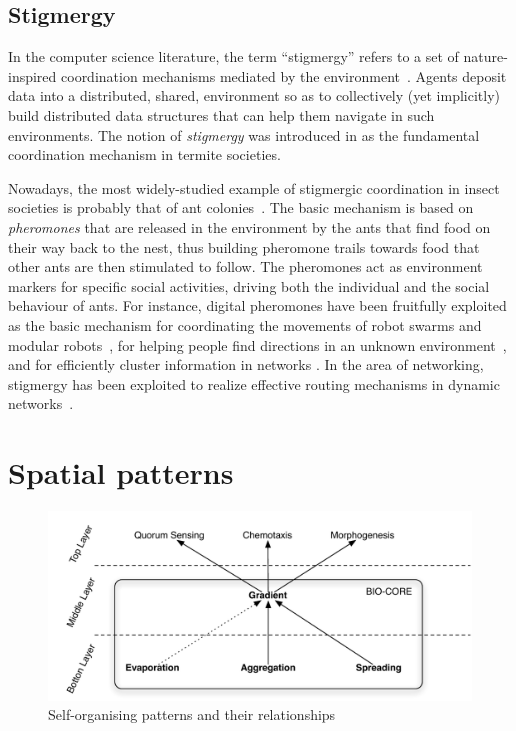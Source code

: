 \documentclass[12pt,a4paper,twoside,openright]{book}
\begin{document}
\subsection{Stigmergy}

In the computer science literature, the term ``stigmergy'' refers to a set of nature-inspired coordination mechanisms mediated by the environment~\cite{stigmergyhistory-artificiallife5,stigmergy-artificiallife5}.
%
Agents deposit data into a distributed, shared, environment so as to collectively (yet implicitly) build distributed data structures that can help them navigate in such environments.
%
The notion of \emph{stigmergy} was introduced in \cite{stigmergy-grasse59} as the fundamental coordination mechanism in termite societies.

Nowadays, the most widely-studied example of stigmergic coordination in insect societies is probably that of ant colonies~\cite{dorigo-aco2004}.
%
The basic mechanism is based on \emph{pheromones} that are released in the environment by the ants that find food on their way back to the nest, thus building pheromone trails towards food that other ants are then stimulated to follow.
%
The pheromones act as environment markers for specific social activities, driving both the individual and the social behaviour of ants.
%
For instance, digital pheromones \cite{pheromoncoord-aamas2002,stigmergy-e4masII} have been fruitfully exploited as the basic mechanism for coordinating the movements of robot swarms and modular robots~\cite{tota-aamas2005}, for helping people find directions in an unknown environment~\cite{MameiZ07}, and for efficiently cluster information in networks \cite{collectivesort-scico74,wordNet}.
%
In the area of networking, stigmergy has been exploited to realize effective routing mechanisms in dynamic networks~\cite{swarmintelligence-book1999,AC-Survey}.

\section{Spatial patterns}

\begin{figure}
\begin{center}
	\includegraphics[width=\textwidth]{img/sc-basic-mech.pdf}
\end{center}
\caption{Self-organising patterns and their relationships}
\label{fig:patterns} 
\end{figure}
\end{document}
